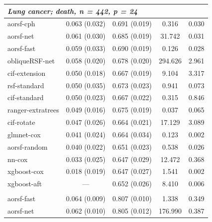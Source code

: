 \documentclass{article}\usepackage[]{graphicx}\usepackage[]{xcolor}
\newenvironment{knitrout}{}{} %
\begin{document}
\begin{knitrout}
\begin{longtable}[t]{lcccc}
\multicolumn{5}{l}{\textit{\textbf{Lung cancer; death, n = 442, p = 24}}}\\
\hline
\hspace{1em}aorsf-cph & 0.063 (0.032) & 0.691 (0.019) & 0.316 & 0.030\\
\hspace{1em}aorsf-net & 0.061 (0.030) & 0.685 (0.019) & 31.742 & 0.031\\
\hspace{1em}aorsf-fast & 0.059 (0.033) & 0.690 (0.019) & 0.126 & 0.028\\
\hspace{1em}obliqueRSF-net & 0.058 (0.020) & 0.678 (0.020) & 294.626 & 2.961\\
\hspace{1em}cif-extension & 0.050 (0.018) & 0.667 (0.019) & 9.104 & 3.317\\
\hspace{1em}rsf-standard & 0.050 (0.035) & 0.673 (0.023) & 0.941 & 0.073\\
\hspace{1em}cif-standard & 0.050 (0.023) & 0.667 (0.022) & 0.315 & 0.846\\
\hspace{1em}ranger-extratrees & 0.049 (0.016) & 0.675 (0.019) & 0.037 & 0.065\\
\hspace{1em}cif-rotate & 0.047 (0.026) & 0.664 (0.021) & 17.129 & 3.089\\
\hspace{1em}glmnet-cox & 0.041 (0.024) & 0.664 (0.034) & 0.123 & 0.002\\
\hspace{1em}aorsf-random & 0.040 (0.022) & 0.651 (0.023) & 0.538 & 0.026\\
\hspace{1em}nn-cox & 0.033 (0.025) & 0.647 (0.029) & 12.472 & 0.368\\
\hspace{1em}xgboost-cox & 0.018 (0.019) & 0.647 (0.027) & 1.541 & 0.002\\
\hspace{1em}xgboost-aft & --- & 0.652 (0.026) & 8.410 & 0.006\\
\addlinespace[0.3em]
\multicolumn{5}{l}{\textit{\textbf{MESA; coronary heart disease, n = 6785, p = 48}}}\\
\hline
\hspace{1em}aorsf-fast & 0.064 (0.009) & 0.807 (0.010) & 1.338 & 0.349\\
\hspace{1em}aorsf-net & 0.062 (0.010) & 0.805 (0.012) & 176.990 & 0.387\\

\end{longtable}
\end{knitrout}
\end{document}
